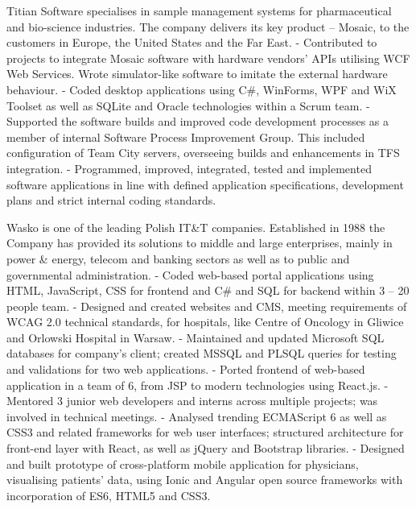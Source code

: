 \documentclass[12pt,english]{resume}
\begin{document}
		Titian Software specialises in sample management systems for pharmaceutical and bio-science industries. The company delivers its key product – Mosaic, to the customers in Europe, the United States and the Far East.
		- Contributed to projects to integrate Mosaic software with hardware vendors’ APIs utilising WCF Web Services. Wrote simulator-like software to imitate the external hardware behaviour.
		- Coded desktop applications using C\#, WinForms, WPF and WiX Toolset as well as SQLite and Oracle technologies within a Scrum team.
		- Supported the software builds and improved code development processes as a member of internal Software Process Improvement Group. This included configuration of Team City servers, overseeing builds and enhancements in TFS integration.
		- Programmed, improved, integrated, tested and implemented software applications in line with defined application specifications, development plans and strict internal coding standards.
		
		Wasko is one of the leading Polish IT\&T companies. Established in 1988 the Company has provided its solutions to middle and large enterprises, mainly in power \& energy, telecom and banking sectors as well as to public and governmental administration.
		- Coded web-based portal applications using HTML, JavaScript, CSS for frontend and C\# and SQL for backend within 3 – 20 people team.
		- Designed and created websites and CMS, meeting requirements of WCAG 2.0 technical standards, for hospitals, like Centre of Oncology in Gliwice and Orlowski Hospital in Warsaw.
		- Maintained and updated Microsoft SQL databases for company’s client; created MSSQL and PLSQL queries for testing and validations for two web applications.
		- Ported frontend of web-based application in a team of 6, from JSP to modern technologies using React.js.
		- Mentored 3 junior web developers and interns across multiple projects; was involved in technical meetings.
		- Analysed trending ECMAScript 6 as well as CSS3 and related frameworks for web user interfaces; structured architecture for front-end layer with React, as well as jQuery and Bootstrap libraries.
		- Designed and built prototype of cross-platform mobile application for physicians, visualising patients’ data, using Ionic and Angular open source frameworks with incorporation of ES6, HTML5 and CSS3.
\end{document}
